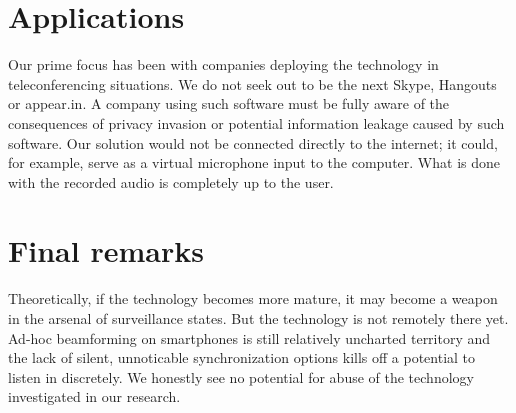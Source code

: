 \section{Applications}
Our prime focus has been with companies deploying the technology in teleconferencing situations. We do not seek out to be the next Skype, Hangouts or appear.in. A company using such software must be fully aware of the consequences of privacy invasion or potential information leakage caused by such software. Our solution would not be connected directly to the internet; it could, for example, serve as a virtual microphone input to the computer. What is done with the recorded audio is completely up to the user. 

\section{Final remarks}
Theoretically, if the technology becomes more mature, it may become a weapon in the arsenal of surveillance states. But the technology is not remotely there yet. Ad-hoc beamforming on smartphones is still relatively uncharted territory and the lack of silent, unnoticable synchronization options kills off a potential to listen in discretely.
We honestly see no potential for abuse of the technology investigated in our research.

